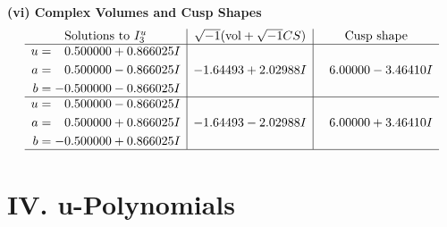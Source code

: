 \documentclass[1p]{elsarticle_modified}
\theoremstyle{definition}
\newcommand{\I}{\sqrt{-1}}
\begin{document}
\newpage\flushleft \textbf{(vi) Complex Volumes and Cusp Shapes}
$$\begin{array}{c|c|c}  
\text{Solutions to }I^u_{3}& \I (\text{vol} + \sqrt{-1}CS) & \text{Cusp shape}\\
 \hline 
\begin{aligned}
u &= \phantom{-}0.500000 + 0.866025 I \\
a &= \phantom{-}0.500000 - 0.866025 I \\
b &= -0.500000 - 0.866025 I\end{aligned}
 & -1.64493 + 2.02988 I & \phantom{-}6.00000 - 3.46410 I \\ \hline\begin{aligned}
u &= \phantom{-}0.500000 - 0.866025 I \\
a &= \phantom{-}0.500000 + 0.866025 I \\
b &= -0.500000 + 0.866025 I\end{aligned}
 & -1.64493 - 2.02988 I & \phantom{-}6.00000 + 3.46410 I\\
 \hline 
 \end{array}$$\newpage
\newpage\renewcommand{\arraystretch}{1}
\centering \section*{ IV. u-Polynomials}
\end{document}
